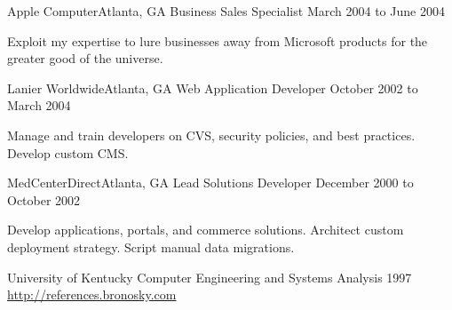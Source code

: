 \documentclass[10pt]{article}
\begin{document}
\sectionheader
{Apple Computer}{Atlanta, GA}
{Business Sales Specialist}
{March 2004 to June 2004}
\begin{longtext}
Exploit my expertise to lure businesses away from Microsoft products for the greater good of the universe.
\end{longtext}

\sectionheader
{Lanier Worldwide}{Atlanta, GA}
{Web Application Developer}
{October 2002 to March 2004}
\begin{longtext}
Manage and train developers on CVS, security policies, and best practices.
Develop custom CMS.
\end{longtext}

\sectionheader
{MedCenterDirect}{Atlanta, GA}
{Lead Solutions Developer}
{December 2000 to October 2002}
\begin{longtext}
Develop applications, portals, and commerce solutions.
Architect custom deployment strategy.
Script manual data migrations.
\end{longtext}


\sectionheader
{University of Kentucky}{}
{Computer Engineering and Systems Analysis}
{1997}
\fix
\halfskip
\href{http://references.bronosky.com}{http://references.bronosky.com}
\end{document}
